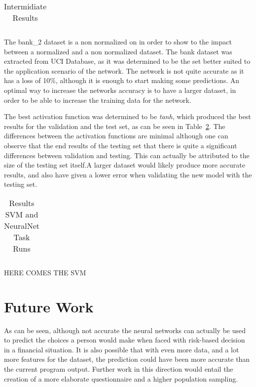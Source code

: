 \documentclass[12pt]{article}
\begin{document}
\begin{table}[h]
    \centering
    \caption{Intermidiate Results}
    \label{tab:label}
    \begin{tabular}{c}
    
    \end{tabular}
\end{table}

The bank\_2 dataset is a non normalized on in order to show to the impact between a normalized and a non normalized dataset. The bank dataset was extracted from UCI Database, as it was determined to be the set better suited to the application scenario of the network. The network is not quite accurate as it has a loss of 10\%, although it is enough to start making some predictions. An optimal way to increase the networks accuracy is to have a larger dataset, in order to be able to increase the training data for the network. 

The best activation function was determined to be \emph{tanh}, which produced the best results for the validation and the test set, as can be seen in Table~\ref{tab:taskRuns}. The differences between the activation functions are minimal although one can observe that the end results of the testing set that there is quite a significant differences between validation and testing. This can actually be attributed to the size of the testing set itself.A larger dataset would likely produce more accurate results, and also have given a lower error when validating the new model with the testing set.

\begin{table}[h]
    \centering
    \caption{Results SVM and NeuralNet Task Runs}
    \label{tab:taskRuns}
    \begin{tabular}{c}
    
    \end{tabular}
\end{table}
HERE COMES THE SVM

\section{Future Work}
\label{sec:future_work}

As can be seen, although not accurate the neural networks can actually be used to predict the choices a person would make when faced with risk-based decision in a financial situation. It is also possible that with even more data, and a lot more features for the dataset, the prediction could have been more accurate than the current program output. Further work in this direction would entail the creation of a more elaborate questionnaire and a higher population sampling.
\end{document}
